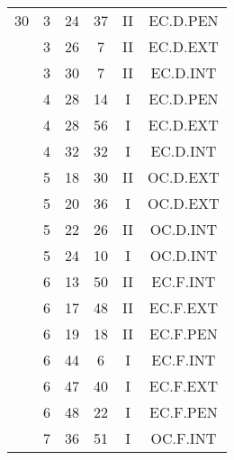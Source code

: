 \documentclass[12pt, a4paper]{article}
\begin{document}
\begin{multicols}{3}
{\begin{tabular}{c c c c c c}
	 	 	 	30 & 3 & 24 & 37 & II & EC.D.PEN\\%
	 	 	 	 & 3 & 26 & 7 & II & EC.D.EXT\\%
	 	 	 	 & 3 & 30 & 7 & II & EC.D.INT\\%
	 	 	 	 & 4 & 28 & 14 & I & EC.D.PEN\\%
	 	 	 	 & 4 & 28 & 56 & I & EC.D.EXT\\%
	 	 	 	 & 4 & 32 & 32 & I & EC.D.INT\\%
	 	 	 	 & 5 & 18 & 30 & II & OC.D.EXT\\%
	 	 	 	 & 5 & 20 & 36 & I & OC.D.EXT\\%
	 	 	 	 & 5 & 22 & 26 & II & OC.D.INT\\%
	 	 	 	 & 5 & 24 & 10 & I & OC.D.INT\\%
	 	 	 	 & 6 & 13 & 50 & II & EC.F.INT\\%
	 	 	 	 & 6 & 17 & 48 & II & EC.F.EXT\\%
	 	 	 	 & 6 & 19 & 18 & II & EC.F.PEN\\%
	 	 	 	 & 6 & 44 & 6 & I & EC.F.INT\\%
	 	 	 	 & 6 & 47 & 40 & I & EC.F.EXT\\%
	 	 	 	 & 6 & 48 & 22 & I & EC.F.PEN\\%
	 	 	 	 & 7 & 36 & 51 & I & OC.F.INT\\%
	 	 \end{tabular}
 	}
\end{multicols}
\end{document}
